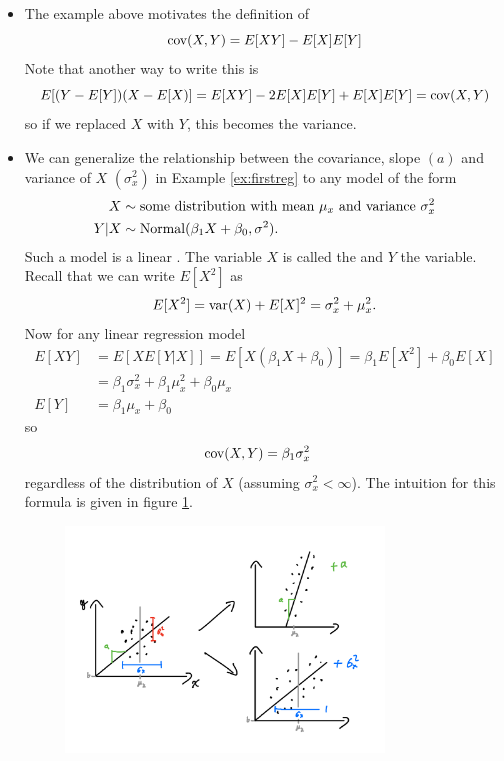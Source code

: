 \begin{itemize}
\item The example above motivates the definition of 
\begin{equation}
{\rm cov}(X,Y) = E[XY]-E[X]E[Y]
\end{equation}
Note that another way to write this is 
\begin{equation*}
 E[(Y-E[Y])(X-E[X)] = E[XY] - 2E[X]E[Y]+E[X]E[Y] = {\rm cov}(X,Y)
\end{equation*}
so if we replaced $X$ with $Y$, this becomes the variance. 
\item We can generalize the relationship between the covariance, slope $(a)$ and variance of $X$ $(\sigma_x^2)$ in Example \ref{ex:firstreg} to any model of the form 
\begin{align}
\begin{split}\label{eq:linreg}
X &\sim \text{some distribution with mean $\mu_x$ and variance $\sigma_x^2$}\\
Y|X &\sim {\rm Normal}(\beta_1X + \beta_0,\sigma^2). 
\end{split}
\end{align}
Such a model is a linear . The variable $X$ is called the  and $Y$ the  variable. 
Recall that we can write $E[X^2]$ as
\begin{equation*}
E[X^2] ={\rm var}(X) + E[X]^2 =  \sigma_x^2 + \mu_x^2. 
\end{equation*}
Now for any linear regression model
\begin{align*}
E[XY] &= E[XE[Y|X]] = E[X(\beta_1 X+\beta_0)] = \beta_1E[X^2] + \beta_0 E[X] \\
&= \beta_1\sigma_x^2 +\beta_1 \mu_x^2 +\beta_0 \mu_x\\
E[Y] &= \beta_1\mu_x +\beta_0
\end{align*}
so 
\begin{align*}
{\rm cov}(X,Y) &= \beta_1\sigma_x^2
\end{align*}
regardless of the distribution of $X$ (assuming $\sigma_x^2 <\infty$). The intuition for this formula is given in figure \ref{fig:cov_effect}. 


\begin{figure}[h]
\centering
\includegraphics[width=0.8\textwidth]{./../figures/cov_effect}
\caption{}\label{fig:cov_effect}
\end{figure}




\end{itemize}

